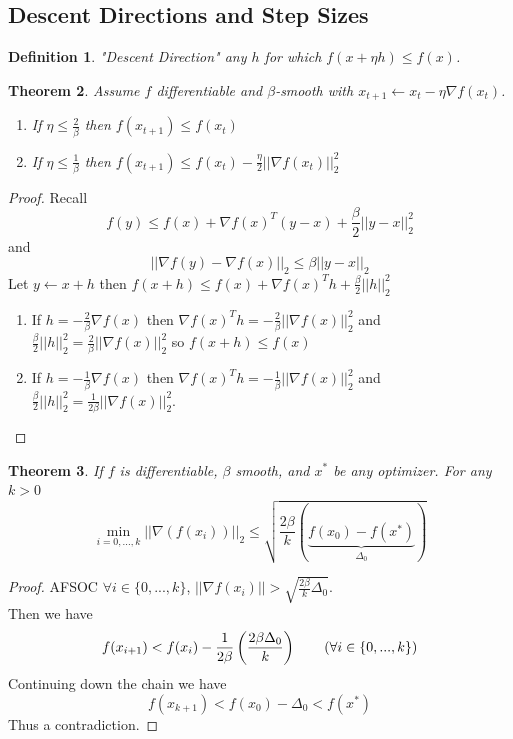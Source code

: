 \documentclass[a4paper]{article}
\newtheorem{thm}{Theorem}[section]
\newtheorem{defn}[thm]{Definition}
\begin{document}
\subsection{Descent Directions and Step Sizes}
\begin{defn}
    "Descent Direction" any $h$ for which $f(x+\eta h)\leq f(x)$. 
\end{defn}
\begin{thm}
    Assume $f$ differentiable and $\beta$-smooth with $x_{t+1}\leftarrow x_{t}-\eta \nabla f(x_t)$. 
    \begin{enumerate}
        \item If $\eta \leq \frac{2}{\beta}$ then $f(x_{t+1})\leq f(x_t)$
        \item If $\eta \leq \frac{1}{\beta}$ then $f(x_{t+1})\leq f(x_t)-\frac{\eta}{2}||\nabla f(x_t)||_2^2$
    \end{enumerate}
\end{thm}
\begin{proof}
    Recall \[
        f(y)\leq f(x)+\nabla f(x)^T(y-x)+\frac{\beta}{2}||y-x||_2^2
    \]  
    and \[
    ||\nabla f(y)-\nabla f(x)||_2\leq \beta||y-x||_2
    \] 
    Let $y\leftarrow x+ h$ then $f(x+h)\leq f(x)+\nabla f(x)^T h+\frac{\beta}{2}||h||_2^2$
    \begin{enumerate}
        \item If $h=-\frac{2}{\beta}\nabla f(x)$ then $\nabla f(x)^Th=-\frac{2}{\beta}||\nabla f(x)||_2^2$ and $\frac{\beta}{2}||h||_2^2=\frac{2}{\beta}||\nabla f(x)||_2^2$ so $f(x+h)\leq f(x)$
        \item If $h=-\frac{1}{\beta}\nabla f(x)$ then $\nabla f(x)^Th=-\frac{1}{\beta}||\nabla f(x)||_2^2$ and $\frac{\beta}{2}||h||_2^2=\frac{1}{2\beta}||\nabla f(x)||_2^2$.
    \end{enumerate}
\end{proof}
\begin{thm}
    If $f$ is differentiable, $\beta$ smooth, and $x^*$ be any optimizer. For any $k>0$ \[
    \min_{i=0,...,k}||\nabla(f(x_i))||_2\leq \sqrt{\frac{2\beta}{k}\left(\underbrace{f(x_0)-f(x^*)}_{\Delta_0}\right)}
    \]
\end{thm}
\begin{proof}
    AFSOC $\forall i\in \{0,...,k\}$, $||\nabla f(x_i)||> \sqrt{\frac{2\beta}{k}\Delta_0}$.\\
    Then we have \[
    f(x_{i+1})< f(x_i)-\frac{1}{2\beta} \left( \frac{2\beta \Delta_0}{k} \right) \tag{$\forall i\in \{0,...,k\}$}
    \] 
    Continuing down the chain we have \[
    f(x_{k+1})<f(x_0)-\Delta_0<f(x^*)
    \] 
    Thus a contradiction. 
\end{proof}
\end{document}

